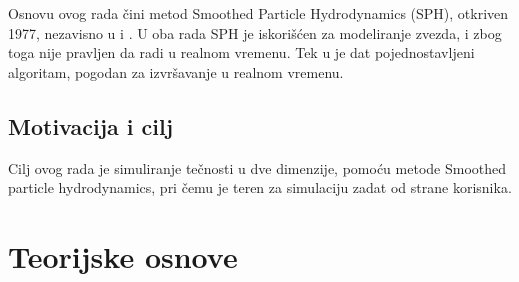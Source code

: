 \documentclass[12pt]{article}
\begin{document}
        Osnovu ovog rada \v cini metod Smoothed Particle Hydrodynamics (SPH), otkriven 1977, nezavisno u \cite{1977MNRAS.181..375G} i \cite{1977AJ.....82.1013L}. U oba rada SPH je iskori\v s\'cen za modeliranje zvezda, i zbog toga nije pravljen da radi u realnom vremenu. Tek u \cite{Muller:2003:PFS:846276.846298} je dat pojednostavljeni algoritam, pogodan za izvr\v savanje u realnom vremenu.

    \subsection{Motivacija i cilj}\label{motivacija}
        Cilj ovog rada je simuliranje te\v cnosti u dve dimenzije, pomo\'cu metode Smoothed particle hydrodynamics, pri \v cemu je teren za simulaciju zadat od strane korisnika.

\section{Teorijske osnove}
\end{document}

